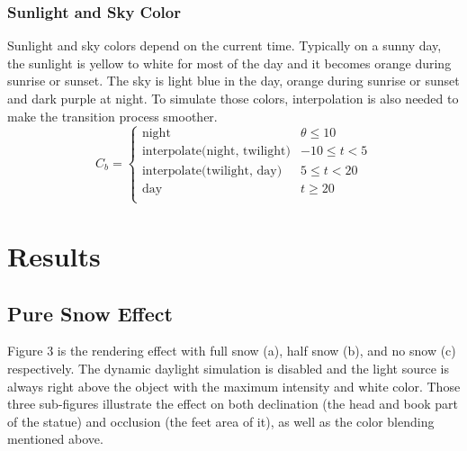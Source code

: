 \documentclass{article}
\begin{document}
\subsubsection {Sunlight and Sky Color}
Sunlight and sky colors depend on the current time. Typically on a sunny day, the sunlight is yellow to white for most of the day and 
it becomes orange during sunrise or sunset. The sky is light blue in the day, orange during sunrise or sunset and dark purple at night. 
To simulate those colors, interpolation is also needed to make the transition process smoother. 
\[
  C_{b}=
  \left\{
    \begin{array}{ll}
      \text{night} & \theta \leq 10 \\
      \text{interpolate(night, twilight)} &  -10 \leq t < 5 \\
      \text{interpolate(twilight, day)} &  5 \leq t < 20 \\
      \text{day} & t \geq 20 \\
    \end{array} 
  \right. 
\]

\section{Results}

\subsection {Pure Snow Effect}
Figure 3 is the rendering effect with full snow (a), half snow (b), and no snow (c) respectively. The dynamic daylight simulation is 
disabled and the light source is always right above the object with the maximum intensity and white color. Those three sub-figures 
illustrate the effect on both declination (the head and book part of the statue) and occlusion (the feet area of it), as well as the 
color blending mentioned above.
\end{document}
